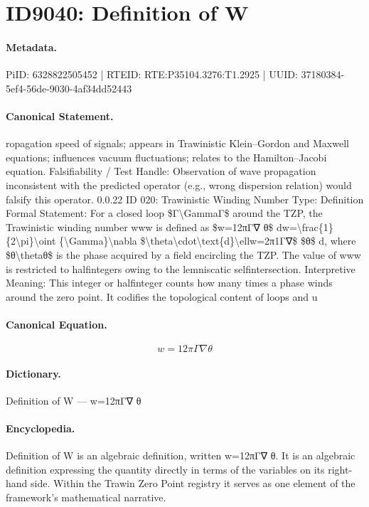 \section*{ID9040: Definition of W}
\paragraph{Metadata.}
PiID: 6328822505452 | RTEID: RTE:P35104.3276:T1.2925 | UUID: 37180384-5ef4-56de-9030-4af34dd52443

\paragraph{Canonical Statement.}
ropagation speed of signals; appears in Trawinistic Klein–Gordon and Maxwell equations; influences vacuum fluctuations; relates to the Hamilton–Jacobi equation. Falsifiability / Test Handle: Observation of wave propagation inconsistent with the predicted operator (e.g., wrong dispersion relation) would falsify this operator. 0.0.22 ID 020: Trawinistic Winding Number Type: Definition Formal Statement: For a closed loop \$Γ\textbackslash{}GammaΓ\$ around the TZP, the Trawinistic winding number www is defined as \$w=12πΓ∇ θ\$ dw=\textbackslash{}frac\{1\}\{2\textbackslash{}pi\}\textbackslash{}oint \{\textbackslash{}Gamma\}\textbackslash{}nabla \$\textbackslash{}theta\textbackslash{}cdot\textbackslash{}text\{d\}\textbackslash{}ellw=2π1Γ∇\$ \$θ\$ d, where \$θ\textbackslash{}thetaθ\$ is the phase acquired by a field encircling the TZP. The value of www is restricted to halfintegers owing to the lemniscatic selfintersection. Interpretive Meaning: This integer or halfinteger counts how many times a phase winds around the zero point. It codifies the topological content of loops and u

\paragraph{Canonical Equation.}
\[
w=12πΓ∇ θ
\]

\paragraph{Dictionary.}
Definition of W — w=12πΓ∇ θ

\paragraph{Encyclopedia.}
Definition of W is an algebraic definition, written w=12πΓ∇ θ. It is an algebraic definition expressing the quantity directly in terms of the variables on its right-hand side. Within the Trawin Zero Point registry it serves as one element of the framework's mathematical narrative.
